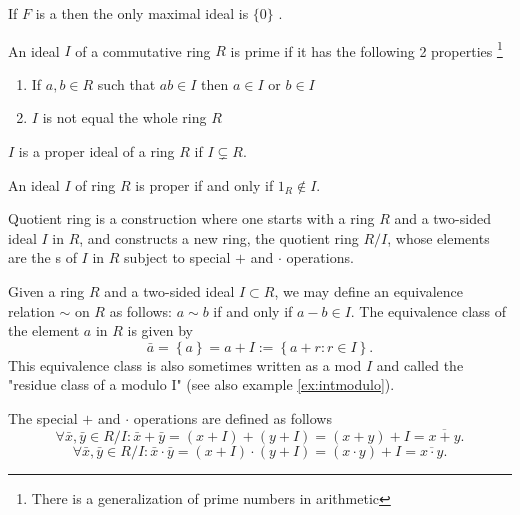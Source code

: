 \begin{appendices}
\begin{example}
  If $F$ is a  then the only maximal ideal is
  $\{0\}$ \cite{wiki:maxideal}.
  \label{ex:maxideal}
\end{example}

\begin{definition}
  An ideal $I$ of a commutative ring $R$ is prime if it has the
  following 2 properties
  \footnote{
    There is a generalization of prime numbers in arithmetic
  }
  \begin{enumerate}
  \item If $a,b \in R$ such that $ab \in I$ then $a \in I$ or $b \in I$
  \item$I$ is not equal the whole ring $R$
  \end{enumerate}
  \label {def:primeideal}
\end{definition}

\begin{definition}
$I$ is a proper ideal of a ring $R$ if $I \subsetneq R$.
\label{def:properideal}
\end{definition}

\begin{theorem}
  An ideal $I$ of ring $R$ is proper if and only if $1_R \notin I$.
  \label{thm:properideal}
\end{theorem}

\begin{definition}
  Quotient ring is a construction where one
  starts with a ring $R$ and a two-sided ideal $I$ in $R$, and constructs a
  new ring, the quotient ring $R/I$, whose elements are the
  s of $I$ 
  in $R$ subject to special $+$ and $\cdot$ operations.

  Given a ring $R$ and a two-sided ideal $I \subset R$, we may define
  an equivalence relation $\sim$ on $R$ as follows: 
  $a \sim b$ if and only if $a - b \in I$.
  The equivalence class of the element $a$ in $R$ is given by
  \[
  \bar{a} = \left\{a\right\} = a + I := \left\{ a + r : r \in I \right\}.
  \]
  This equivalence class is also sometimes written as a mod $I$ and
  called the "residue class of a modulo I" (see also example
  \ref{ex:intmodulo}).

  The special $+$ and $\cdot$ operations are defined as follows
  \[
  \forall \bar{x},\bar{y} \in R/I:
  \bar{x} + \bar{y} = \left(x + I\right) + \left(y + I\right) =
  \left(x+y\right) + I = \overline{x+y}.
  \]
  \[
  \forall \bar{x},\bar{y} \in R/I:
  \bar{x} \cdot \bar{y} = \left(x + I\right) \cdot \left(y + I\right) =
  \left(x \cdot y\right) + I = \overline{x \cdot y}.
  \]


\end{definition}
\end{appendices}
